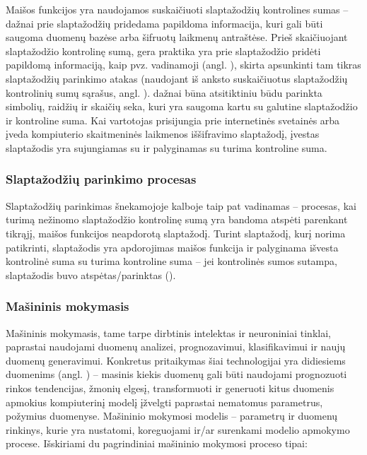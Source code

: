 \documentclass{VUMIFInfBakalaurinis}
\begin{document}
Maišos funkcijos yra naudojamos suskaičiuoti slaptažodžių kontrolines sumas -- 
dažnai prie slaptažodžių pridedama papildoma informacija, kuri gali būti saugoma 
duomenų bazėse arba šifruotų laikmenų antraštėse. Prieš skaičiuojant 
slaptažodžio kontrolinę sumą, gera praktika yra prie slaptažodžio pridėti 
papildomą informaciją, kaip pvz. vadinamoji  (angl. 
), skirta apsunkinti tam tikras slaptažodžių parinkimo atakas 
(naudojant iš anksto suskaičiuotus slaptažodžių kontrolinių sumų sąrašus, angl. 
).  dažnai būna atsitiktiniu būdu
parinkta simbolių, raidžių ir skaičių seka, kuri yra saugoma kartu su galutine 
slaptažodžio ir  kontroline suma. Kai vartotojas prisijungia 
prie internetinės svetainės arba įveda kompiuterio skaitmeninės laikmenos 
iššifravimo slaptažodį, įvestas slaptažodis yra sujungiamas su 
 ir palyginamas su turima kontroline suma.

\subsubsection{Slaptažodžių parinkimo procesas}
Slaptažodžių parinkimas šnekamojoje kalboje taip pat vadinamas 
 -- procesas, kai turimą nežinomo slaptažodžio 
kontrolinę sumą yra bandoma atspėti parenkant tikrąjį, maišos funkcijos 
neapdorotą slaptažodį. Turint slaptažodį, kurį norima patikrinti, slaptažodis 
yra apdorojimas maišos funkcija ir palyginama išvesta kontrolinė suma su turima 
kontroline suma -- jei kontrolinės sumos sutampa, slaptažodis buvo 
atspėtas/parinktas ().

\subsubsection{Mašininis mokymasis}
Mašininis mokymasis, tame tarpe dirbtinis intelektas ir neuroniniai tinklai, 
paprastai naudojami duomenų analizei, prognozavimui, klasifikavimui ir naujų 
duomenų generavimui. Konkretus pritaikymas šiai technologijai yra didiesiems 
duomenims (angl. ) -- masinis kiekis duomenų gali būti 
naudojami prognozuoti rinkos tendencijas, žmonių elgesį, transformuoti ir 
generuoti kitus duomenis apmokius kompiuterinį modelį įžvelgti paprastai 
nematomus parametrus, požymius duomenyse. Mašininio mokymosi modelis -- 
parametrų ir duomenų rinkinys, kurie yra nustatomi, koreguojami ir/ar surenkami 
modelio apmokymo procese. Išskiriami du pagrindiniai mašininio mokymosi proceso 
tipai:
\end{document}
